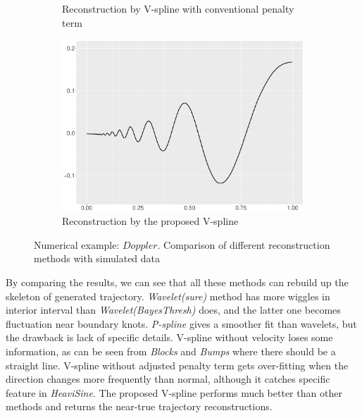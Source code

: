 \begin{figure}
\begin{subfigure}{0.45\textwidth}
    \caption{Reconstruction by V-spline with conventional penalty term}
    \end{subfigure}
    \begin{subfigure}{0.45\textwidth}
    \centering
    \includegraphics[width=\linewidth,height=0.45\textwidth]{Chapters/02TractorSplineTheory/plot/ggplot/ggDopplerTractor.pdf}
    \caption{Reconstruction by the proposed V-spline}
    \end{subfigure}
\caption{Numerical example: $\textit{Doppler}$. Comparison of different reconstruction methods with simulated data}\label{num4}
 \end{figure}

By comparing the results, we can see that all these methods can rebuild up the skeleton of generated trajectory. \textit{Wavelet(sure)} method has more wiggles in interior interval than \textit{Wavelet(BayesThresh)} does, and the latter one becomes fluctuation near boundary knots. \textit{P-spline} gives a smoother fit than wavelets, but the drawback is lack of specific details. V-spline without velocity loses some information, as can be seen from \textit{Blocks} and \textit{Bumps} where there should be a straight line. V-spline without adjusted penalty term gets over-fitting when the direction changes more frequently than normal, although it catches specific feature in \textit{HeaviSine}. The proposed V-spline performs much better than other methods and returns the near-true trajectory reconstructions.  


